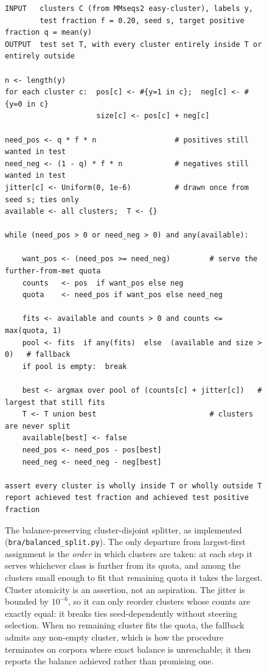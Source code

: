 \documentclass[11pt,a4paper]{article}
\begin{document}
\begin{figure}[htbp]
\small
\begin{verbatim}
INPUT   clusters C (from MMseqs2 easy-cluster), labels y,
        test fraction f = 0.20, seed s, target positive fraction q = mean(y)
OUTPUT  test set T, with every cluster entirely inside T or entirely outside

n <- length(y)
for each cluster c:  pos[c] <- #{y=1 in c};  neg[c] <- #{y=0 in c}
                     size[c] <- pos[c] + neg[c]

need_pos <- q * f * n                  # positives still wanted in test
need_neg <- (1 - q) * f * n            # negatives still wanted in test
jitter[c] <- Uniform(0, 1e-6)          # drawn once from seed s; ties only
available <- all clusters;  T <- {}

while (need_pos > 0 or need_neg > 0) and any(available):

    want_pos <- (need_pos >= need_neg)         # serve the further-from-met quota
    counts   <- pos  if want_pos else neg
    quota    <- need_pos if want_pos else need_neg

    fits <- available and counts > 0 and counts <= max(quota, 1)
    pool <- fits  if any(fits)  else  (available and size > 0)   # fallback
    if pool is empty:  break

    best <- argmax over pool of (counts[c] + jitter[c])   # largest that still fits
    T <- T union best                          # clusters are never split
    available[best] <- false
    need_pos <- need_pos - pos[best]
    need_neg <- need_neg - neg[best]

assert every cluster is wholly inside T or wholly outside T
report achieved test fraction and achieved test positive fraction
\end{verbatim}
\caption{The balance-preserving cluster-disjoint splitter, as implemented
(\texttt{bra/balanced\_split.py}). The only departure from largest-first assignment is the
\emph{order} in which clusters are taken: at each step it serves whichever class is further
from its quota, and among the clusters small enough to fit that remaining quota it takes the
largest. Cluster atomicity is an assertion, not an aspiration. The jitter is bounded by
$10^{-6}$, so it can only reorder clusters whose counts are exactly equal: it breaks ties
seed-dependently without steering selection. When no remaining cluster fits the quota, the
fallback admits any non-empty cluster, which is how the procedure terminates on corpora
where exact balance is unreachable; it then reports the balance achieved rather than
promising one.}
\label{alg:splitter}
\end{figure}
\end{document}
